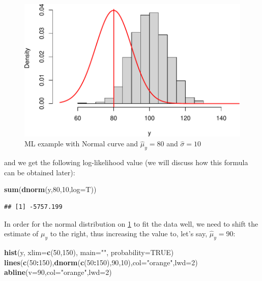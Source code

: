 \documentclass[
]{book}
\newenvironment{Shaded}{\begin{snugshade}}{\end{snugshade}}
\newcommand{\AttributeTok}[1]{\textcolor[rgb]{0.13,0.29,0.53}{#1}}
\newcommand{\ConstantTok}[1]{\textcolor[rgb]{0.56,0.35,0.01}{#1}}
\newcommand{\DecValTok}[1]{\textcolor[rgb]{0.00,0.00,0.81}{#1}}
\newcommand{\FunctionTok}[1]{\textcolor[rgb]{0.13,0.29,0.53}{\textbf{#1}}}
\newcommand{\NormalTok}[1]{#1}
\newcommand{\SpecialCharTok}[1]{\textcolor[rgb]{0.81,0.36,0.00}{\textbf{#1}}}
\newcommand{\StringTok}[1]{\textcolor[rgb]{0.31,0.60,0.02}{#1}}
\theoremstyle{definition}
\theoremstyle{definition}
\theoremstyle{definition}
\theoremstyle{definition}
\theoremstyle{remark}
\begin{document}
\begin{figure}
\centering
\includegraphics{Svetunkov---Statistics-for-Business-Analytics_files/figure-latex/MLENormalExample01-1.pdf}
\caption{\label{fig:MLENormalExample01}ML example with Normal curve and \(\hat{\mu}_y=80\) and \(\hat{\sigma}=10\)}
\end{figure}

and we get the following log-likelihood value (we will discuss how this formula can be obtained later):

\begin{Shaded}
\begin{Highlighting}[]
\FunctionTok{sum}\NormalTok{(}\FunctionTok{dnorm}\NormalTok{(y,}\DecValTok{80}\NormalTok{,}\DecValTok{10}\NormalTok{,}\AttributeTok{log=}\NormalTok{T))}
\end{Highlighting}
\end{Shaded}

\begin{verbatim}
## [1] -5757.199
\end{verbatim}

In order for the normal distribution on \ref{fig:MLENormalExample01} to fit the data well, we need to shift the estimate of \(\mu_y\) to the right, thus increasing the value to, let's say, \(\hat{\mu}_y=90\):

\begin{Shaded}
\begin{Highlighting}[]
\FunctionTok{hist}\NormalTok{(y, }\AttributeTok{xlim=}\FunctionTok{c}\NormalTok{(}\DecValTok{50}\NormalTok{,}\DecValTok{150}\NormalTok{), }\AttributeTok{main=}\StringTok{""}\NormalTok{, }\AttributeTok{probability=}\ConstantTok{TRUE}\NormalTok{)}
\FunctionTok{lines}\NormalTok{(}\FunctionTok{c}\NormalTok{(}\DecValTok{50}\SpecialCharTok{:}\DecValTok{150}\NormalTok{),}\FunctionTok{dnorm}\NormalTok{(}\FunctionTok{c}\NormalTok{(}\DecValTok{50}\SpecialCharTok{:}\DecValTok{150}\NormalTok{),}\DecValTok{90}\NormalTok{,}\DecValTok{10}\NormalTok{),}\AttributeTok{col=}\StringTok{"orange"}\NormalTok{,}\AttributeTok{lwd=}\DecValTok{2}\NormalTok{)}
\FunctionTok{abline}\NormalTok{(}\AttributeTok{v=}\DecValTok{90}\NormalTok{,}\AttributeTok{col=}\StringTok{"orange"}\NormalTok{,}\AttributeTok{lwd=}\DecValTok{2}\NormalTok{)}
\end{Highlighting}
\end{Shaded}
\end{document}
